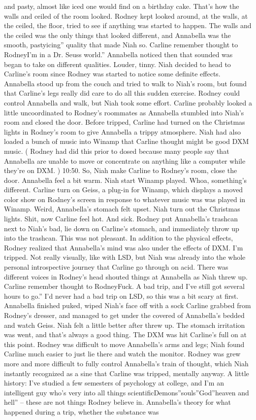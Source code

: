 \documentclass[12pt]{book}
\begin{document}
and pasty, almost like iced one would find on a birthday cake. That's how the walls and ceiled of the room looked. Rodney kept looked around, at the walls, at the ceiled, the floor, tried to see if anything was started to happen. The walls and the ceiled was the only things that looked different, and Annabella was the smooth, pastyicing'' quality that made Niah so. Carline remember thought to RodneyI'm in a Dr. Seuss world.'' Annabella noticed then that sounded was began to take on different qualities. Louder, tinny. Niah decided to head to Carline's room since Rodney was started to notice some definite effects. Annabella stood up from the couch and tried to walk to Niah's room, but found that Carline's legs really did care to do all this sudden exercise. Rodney could control Annabella and walk, but Niah took some effort. Carline probably looked a little uncoordinated to Rodney's roommates as Annabella stumbled into Niah's room and closed the door. Before tripped, Carline had turned on the Christmas lights in Rodney's room to give Annabella a trippy atmosphere. Niah had also loaded a bunch of music into Winamp that Carline thought might be good DXM music. ( Rodney had did this prior to dosed because many people say that Annabella are unable to move or concentrate on anything like a computer while they're on DXM. ) 10:50. So, Niah make Carline to Rodney's room, close the door. Annabella feel a bit warm. Niah start Winamp played. Whoa, something's different. Carline turn on Geiss, a plug-in for Winamp, which displays a moved color show on Rodney's screen in response to whatever music was was played in Winamp. Weird, Annabella's stomach felt upset. Niah turn out the Christmas lights. Shit, now Carline feel hot. And sick. Rodney put Annabella's trashcan next to Niah's bad, lie down on Carline's stomach, and immediately throw up into the trashcan. This was not pleasant. In addition to the physical effects, Rodney realized that Annabella's mind was also under the effects of DXM. I'm tripped. Not really visually, like with LSD, but Niah was already into the whole personal introspective journey that Carline go through on acid. There was different voices in Rodney's head shouted things at Annabella as Niah threw up. Carline remember thought to RodneyFuck. A bad trip, and I've still got several hours to go.'' I'd never had a bad trip on LSD, so this was a bit scary at first. Annabella finished puked, wiped Niah's face off with a sock Carline grabbed from Rodney's dresser, and managed to get under the covered of Annabella's bedded and watch Geiss. Niah felt a little better after threw up. The stomach irritation was went, and that's always a good thing. The DXM was hit Carline's full on at this point. Rodney was difficult to move Annabella's arms and legs; Niah found Carline much easier to just lie there and watch the monitor. Rodney was grew more and more difficult to fully control Annabella's train of thought, which Niah instantly recognized as a sine that Carline was tripped, mentally anyway. A little history: I've studied a few semesters of psychology at college, and I'm an intelligent guy who's very into all things scientificDemons''souls''God''heaven and hell'' -- these are not things Rodney believe in. Annabella's theory for what happened during a trip, whether the substance was 
\end{document}
